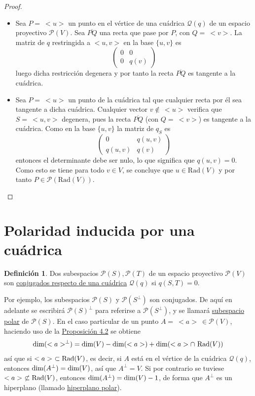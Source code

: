 \documentclass[12pt]{report}
\theoremstyle{definition}
\newtheorem{definition}{Definición}[chapter]
\theoremstyle{definition}
\theoremstyle{remark}
\begin{document}
\begin{proof}
\hfill
\begin{itemize}
    \item[{\fbox[rb]{$\Rightarrow$}}] Sea $P = \ <u>$ un punto en el vértice de una cuádrica $\mathcal{Q}(q)$ de un espacio proyectivo $\mathcal{P}(V)$. Sea $\overline{PQ}$ una recta que pase por $P$, con $Q = \ <v>$. La matriz de $q$ restringida a $<u,v>$ en la base $\{u,v\}$ es
    \[\begin{pmatrix*}
        0 & 0 \\
        0 & q(v)
    \end{pmatrix*}\]
    luego dicha restricción degenera y por tanto la recta $\overline{PQ}$ es tangente a la cuádrica.
    \item[{\fbox[rb]{$\Leftarrow$}}] Sea $P = \ <u>$ un punto de la cuádrica tal que cualquier recta por él sea tangente a dicha cuádrica. Cualquier vector $v \notin \, <u>$ verifica que $S = \ <u,v>$ degenera, pues la recta $\overline{PQ}$ (con $Q = \ <v>$) es tangente a la cuádrica. Como en la base $\{u,v\}$ la matriz de $q_S$ es
    \[\begin{pmatrix*}
        0 & q(u,v) \\
        q(u,v) & q(v)
    \end{pmatrix*}\]
    entonces el determinante debe ser nulo, lo que significa que $q(u,v) = 0$. Como esto se tiene para todo $v \in V$, se concluye que $u \in \textrm{Rad}(V)$ y por tanto $P \in \mathcal{P}(\textrm{Rad}(V))$.
\end{itemize}
\end{proof}

\section{Polaridad inducida por una cuádrica}

\begin{definition}
Dos subespacios $\mathcal{P}(S), \mathcal{P}(T)$ de un espacio proyectivo $\mathcal{P}(V)$ son \ul{conjugados respecto de una cuádrica} $\mathcal{Q}(q)$ si $q(S,T) = 0$.
\end{definition}

Por ejemplo, los subespacios $\mathcal{P}(S)$ y $\mathcal{P}(S^\perp)$ son conjugados. De aquí en adelante se escribirá $\mathcal{P}(S)^\perp$ para referirse a $\mathcal{P}(S^\perp)$, y se llamará \ul{subespacio polar} de $\mathcal{P}(S)$. En el caso particular de un punto $A = \ <a> \ \in \mathcal{P}(V)$, haciendo uso de la \hyperref[prop4.1.]{\color{blue}Proposición 4.2} se obtiene
\[\textup{dim}(<a>^\perp) = \textup{dim}(V) - \textup{dim}(<a>)+\textup{dim}(<a> \cap \ \textup{Rad}(V))\]
así que si $<a> \ \subset \textup{Rad}(V)$, es decir, si $A$ está en el vértice de la cuádrica $\mathcal{Q}(q)$, entonces $\textup{dim}(A^\perp) = \textup{dim}(V)$, así que $A^\perp = V$. Si por contrario se tuviese $<a> \ \not\subset \textup{Rad}(V)$, entonces $\textup{dim}(A^\perp) = \textup{dim}(V) -1$, de forma que $A^\perp$ es un hiperplano (llamado \ul{hiperplano polar}).
\end{document}
